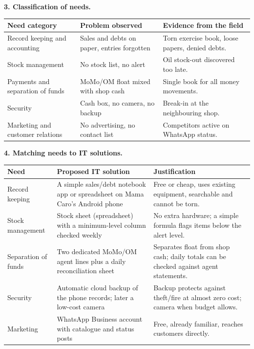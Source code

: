 \documentclass[11pt]{article}
\begin{document}
\begin{exoresolu}
\textbf{3. Classification of needs.}

\begin{center}
\begin{tabularx}{\linewidth}{|l|X|X|}\hline
\rowcolor{popblueL} \textbf{Need category} & \textbf{Problem observed} & \textbf{Evidence from the field} \\ \hline
Record keeping and accounting & Sales and debts on paper, entries forgotten & Torn exercise book, loose papers, denied debts. \\ \hline
Stock management & No stock list, no alert & Oil stock-out discovered too late. \\ \hline
Payments and separation of funds & MoMo/OM float mixed with shop cash & Single book for all money movements. \\ \hline
Security & Cash box, no camera, no backup & Break-in at the neighbouring shop. \\ \hline
Marketing and customer relations & No advertising, no contact list & Competitors active on WhatsApp status. \\ \hline
\end{tabularx}
\end{center}

\textbf{4. Matching needs to IT solutions.}

\begin{center}
\begin{tabularx}{\linewidth}{|l|X|X|}\hline
\rowcolor{popblueL} \textbf{Need} & \textbf{Proposed IT solution} & \textbf{Justification} \\ \hline
Record keeping & A simple sales/debt notebook app or spreadsheet on Mama Caro's Android phone & Free or cheap, uses existing equipment, searchable and cannot be torn. \\ \hline
Stock management & Stock sheet (spreadsheet) with a minimum-level column checked weekly & No extra hardware; a simple formula flags items below the alert level. \\ \hline
Separation of funds & Two dedicated MoMo/OM agent lines plus a daily reconciliation sheet & Separates float from shop cash; daily totals can be checked against agent statements. \\ \hline
Security & Automatic cloud backup of the phone records; later a low-cost camera & Backup protects against theft/fire at almost zero cost; camera when budget allows. \\ \hline
Marketing & WhatsApp Business account with catalogue and status posts & Free, already familiar, reaches customers directly. \\ \hline
\end{tabularx}
\end{center}


\end{exoresolu}
\end{document}
